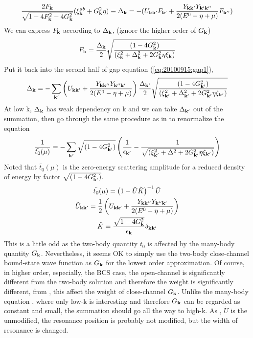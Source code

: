 \begin{equation}\label{eq:20100915:gap1}
\frac{2F_{\mathbf{k}}}{\sqrt{1-4 F_{\mathbf{k}}^2-4 G_{\mathbf{k}}^2}} (\xi^{ab}_{\mathbf{k}}+  G_{\mathbf{k}}^2\eta)\equiv\Delta_{\mathbf{k}}=-(U_{\mathbf{k}\mathbf{k}'}F_{\mathbf{k}'}+\frac{Y_{\mathbf{k}\mathbf{k}'}Y_{\mathbf{k}'\mathbf{k}''}}{2(E^{0}-\eta+\mu)}F_{\mathbf{k}''})
\end{equation}
We can express $F_{\mathbf{k}}$ according to $\Delta_{\mathbf{k}}$,  (ignore the higher order of $G_{\mathbf{k}}$)
\begin{equation}
F_{\mathbf{k}}=\frac{\Delta_{\mathbf{k}}}2\sqrt{\frac{(1-4G_{\mathbf{k}}^{2})}{(\xi_{\mathbf{k}}^{2}+\Delta_{\mathbf{k}}^{2}+2G_{\mathbf{k}}^{2}\eta\xi_{\mathbf{k}})}}
\end{equation}
Put it back into the second half of gap equation (\ref{eq:20100915:gap1}), 
\begin{equation}\label{eq:20100915:onechannel}
\Delta_{\mathbf{k}}=-\sum_{\mathbf{k}'}\left(U_{\mathbf{k}\mathbf{k}'}+\frac{Y_{\mathbf{k}\mathbf{k}''}Y_{\mathbf{k}''\mathbf{k}'}}{2(E^{0}-\eta+\mu)}\right)\frac{\Delta_{\mathbf{k}'}}2\sqrt{\frac{(1-4G_{\mathbf{k}'}^{2})}{(\xi_{\mathbf{k}'}^{2}+\Delta_{\mathbf{k}'}^{2}+2G_{\mathbf{k}'}^{2}\eta\xi_{\mathbf{k}'})}}
\end{equation}
At low k, $\Delta_{\mathbf{k}}$ has weak dependency on k and we can take $\Delta_{\mathbf{k}'}$ out of the summation,  then go through the same procedure as in \cite{Leggett,Fetter} to renormalize the equation
\begin{equation}\label{eq:20100915:renormGap}
\frac{1}{\tilde{t_{0}}(\mu)}=-\sum_{\mathbf{k}'}\sqrt{(1-4G_{\mathbf{k}'}^{2})}
\left(\frac{1}{\epsilon_{\mathbf{k}'}}-\frac{1}{\sqrt{(\xi_{\mathbf{k}'}^{2}+\Delta^{2}+2G_{\mathbf{k}'}^{2}\eta\xi_{\mathbf{k}'})}}\right)
\end{equation}
Noted that $\tilde{t_{0}}(\mu)$ is the zero-energy scattering amplitude for a reduced density of energy by factor $\sqrt{(1-4G_{\mathbf{k}'}^{2})}$.  
\begin{gather}
\tilde{t_{0}}(\mu)=\left(1-\tilde{U}\tilde{ K}\right)^{-1}\tilde{U}\label{eq:20100915:t0}\\
\tilde{U}_{\mathbf{k}\mathbf{k}'}=\frac{1}{2} \left(U_{\mathbf{k}\mathbf{k}'}+\frac{Y_{\mathbf{k}\mathbf{k}''}Y_{\mathbf{k}''\mathbf{k}'}}{2(E^{0}-\eta+\mu)}\right)\label{eq:20100915:tu}\\
\tilde{K}=\frac{\sqrt{1-4G_{\mathbf{k}}^{2}}}{\epsilon_{\mathbf{k}}}\delta_{\mathbf{k}\mathbf{k}'}\label{eq:20100915:tk}
\end{gather}
This is a little odd as the two-body quantity $t_{0}$ is affected by the many-body quantity $G_{\mathbf{k}}$.  Nevertheless, it seems OK to simply use the two-body close-channel bound-state wave function as $G_{\mathbf{k}}$ for the lowest order approximation.   Of course, in higher order, especially, the BCS case, the open-channel is significantly different from the two-body solution and therefore the weight is significantly different, from , this affect the weight of close-channel $G_{\mathbf{k}}$.  Unlike the many-body equation , where only low-k is interesting and therefore $G_{\mathbf{k}}$ can be regarded as constant and small, the summation should go all the way to high-k.  As , $\tilde{U}$ is the unmodified, the resonance position is probably not modified, but the width of resonance is changed.  



